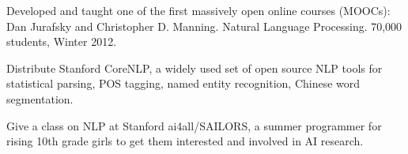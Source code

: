 \documentclass[11pt,letterpaper]{article}
\begin{document}
\begin{vita}
\begin{Synergistic Activities}
\item Developed and taught one of the first massively open online
  courses (MOOCs): Dan Jurafsky and Christopher D. Manning. Natural Language Processing. 70,000 students, Winter 2012.

\item Distribute Stanford CoreNLP, a widely used set of open source NLP tools for statistical parsing,
POS tagging, named entity recognition, Chinese word segmentation.

\item Give a class on NLP at Stanford ai4all/SAILORS, a summer programmer for rising 10th grade girls to get them 
interested and involved in AI research.




\end{Synergistic Activities}


\vspace*{24pt}

\vfill
\end{vita}
\end{document}

